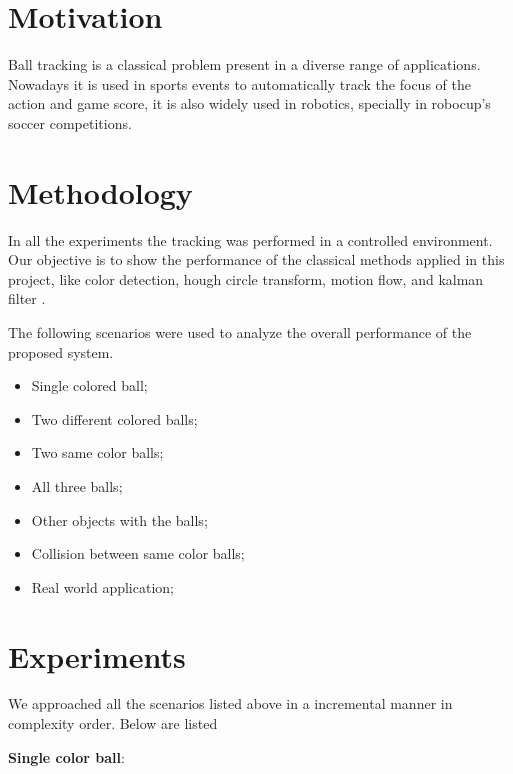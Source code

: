 \documentclass{sciposter}
\begin{document}
\begin{multicols}{3}


\section{Motivation}

Ball tracking is a classical problem present in a diverse range of applications. Nowadays it is used in sports events to automatically track the focus of the action and game score, it is also widely used in robotics, specially in robocup's soccer competitions.

\section{Methodology}

In all the experiments the tracking was performed in a controlled environment. Our objective is to show the performance of the classical methods applied in this project, like color detection, hough circle transform, motion flow, and kalman filter .

\bigbreak

The following scenarios were used to analyze the overall performance of the proposed system.

\begin{itemize}

\item Single colored ball;
\item Two different colored balls;
\item Two same color balls;
\item All three balls;
\item Other objects with the balls;
\item Collision between same color balls;
\item Real world application;

\end{itemize}

\section{Experiments}

We approached all the scenarios listed above in a incremental manner in complexity order. Below are listed

\bigbreak
\textbf{Single color ball}:


\end{multicols}
\end{document}
